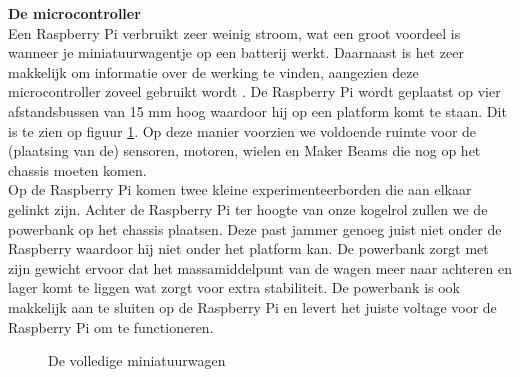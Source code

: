 \documentclass[a4paper,kulak]{kulakarticle}
\begin{document}
\textbf{\large De microcontroller} \\
Een Raspberry Pi verbruikt zeer weinig stroom, wat een groot voordeel is wanneer je miniatuurwagentje op een batterij werkt. Daarnaast is het zeer makkelijk om informatie over de werking te vinden, aangezien deze microcontroller zoveel gebruikt wordt \cite{rasp}.
De Raspberry Pi wordt geplaatst op vier afstandsbussen van 15 mm hoog waardoor hij op een platform komt te staan. Dit is te zien op figuur \ref{fig:afbchassis}. Op deze manier voorzien we voldoende ruimte voor de (plaatsing van de) sensoren, motoren, wielen en Maker Beams die nog op het chassis moeten komen. \\ Op de Raspberry Pi komen twee kleine experimenteerborden die aan elkaar gelinkt zijn. Achter de Raspberry Pi ter hoogte van onze kogelrol zullen we de powerbank op het chassis plaatsen. Deze past jammer genoeg juist niet onder de Raspberry waardoor hij niet onder het platform kan. De powerbank zorgt met zijn gewicht ervoor dat het massamiddelpunt van de wagen meer naar achteren en lager komt te liggen wat zorgt voor extra stabiliteit. De powerbank is ook makkelijk aan te sluiten op de Raspberry Pi en levert het juiste voltage voor de Raspberry Pi om te functioneren. 

\begin{figure} [h]


	
	\caption{De volledige miniatuurwagen}\label{fig:afbchassis}
\end{figure}
\end{document}
